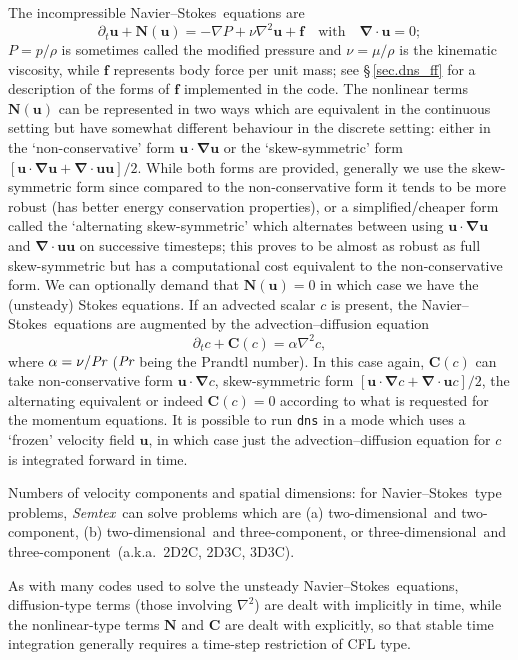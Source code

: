 \documentclass[11pt]{report}
\def\Pr{\mbox{\it Pr}}                              %
\newcommand{\Semtex}{\emph{Semtex}} \newcommand{\Dog}{\emph{Dog}}
\newcommand\twod{two-di\-men\-sion\-al}
\newcommand\threed{three-di\-men\-sion\-al}
\newcommand\twoc{two-com\-po\-nent}
\newcommand\threec{three-com\-po\-nent}
\newcommand\NavSto{Navier--Stokes}
\begin{document}
The incompressible \NavSto\ equations are
\begin{equation}
\partial_t\bm{u}+\bm{N}(\bm{u}) = -\nabla P + \nu\nabla^2\bm{u} + \bm{f}
\quad\text{with}\quad
\bm{\nabla\cdot u} = 0;
\label{eq.navsto}
\end{equation}
$P=p/\rho$ is sometimes called the modified pressure and
$\nu=\mu/\rho$ is the kinematic viscosity, while $\bm{f}$ represents
body force per unit mass; see \S\,\ref{sec.dns_ff} for a description
of the forms of $\bm{f}$ implemented in the code.  The nonlinear terms
$\bm{N}(\bm{u})$ can be represented in two ways which are equivalent
in the continuous setting but have somewhat different behaviour in the
discrete setting: either in the `non-conservative' form
$\bm{u\cdot\nabla u}$ or the `skew-symmetric' form $[\bm{u\cdot\nabla
    u} + \bm{\nabla\cdot uu}]/2$.
%
While both forms are provided, generally we use the skew-symmetric
form since compared to the non-conservative form it tends to be more
robust (has better energy conservation properties), or a
simplified/cheaper form called the `alternating skew-symmetric' which
alternates between using $\bm{u\cdot\nabla u}$ and $\bm{\nabla\cdot
  uu}$ on successive timesteps; this proves to be almost as robust as
full skew-symmetric but has a computational cost equivalent to the
non-conservative form.  We can optionally demand that $\bm{N}(\bm{u})
= 0$ in which case we have the (unsteady) Stokes equations.
%
If an advected scalar $c$ is present, the \NavSto\ equations are
augmented by the advection--diffusion equation
\begin{equation}
  \partial_t c + \bm{C}(c) = \alpha\nabla^2 c,
  \label{eq.advectdiff}
\end{equation}
where $\alpha = \nu/\Pr$ ($\Pr$ being the Prandtl number).  In this
case again, $\bm{C}(c)$ can take non-conservative form
$\bm{u\cdot\nabla}c$, skew-symmetric form $[\bm{u\cdot\nabla}c +
  \bm{\nabla\cdot u}c]/2$, the alternating equivalent or indeed
$\bm{C}(c)=0$ according to what is requested for the momentum
equations.  It is possible to run \verb|dns| in a mode which uses a
`frozen' velocity field $\bm{u}$, in which case just the
advection--diffusion equation for $c$ is integrated forward in time.

Numbers of velocity components and spatial dimensions: for
\NavSto\ type problems, \Semtex\ can solve problems which are (a)
\twod\ and \twoc, (b) \twod\ and \threec, or \threed\ and
\threec\ (a.k.a.\ 2D2C, 2D3C, 3D3C).

As with many codes used to solve the unsteady \NavSto\ equations,
diffusion-type terms (those involving $\nabla^2$) are dealt with
implicitly in time, while the nonlinear-type terms $\bm{N}$ and
$\bm{C}$ are dealt with explicitly, so that stable time integration
generally requires a time-step restriction of CFL type.
\end{document}
